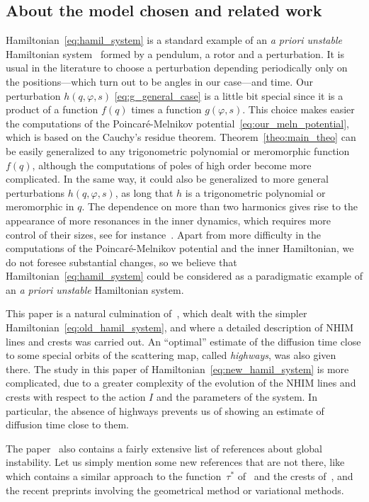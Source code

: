 \documentclass[a4paper,10pt]{article}
\theoremstyle{definition}
\begin{document}
\subsection{About the model chosen and related work}
Hamiltonian~\eqref{eq:hamil_system} is a standard example of an \emph{a priori unstable} Hamiltonian
system~\cite{ChierchiaGallavotti} formed by a pendulum, a rotor and a perturbation. It is usual
in the literature to choose a perturbation depending periodically only on the
positions---which turn out to be angles in our case---and time. Our perturbation $h(q,\varphi,s)$ \eqref{eq:g_general_case}
is a little bit special since it is a product of a function $f(q)$ times a function $g(\varphi,s)$. This
choice makes easier the computations of the Poincar\'e-Melnikov potential~\eqref{eq:our_meln_potential},
which is based on the Cauchy's residue theorem.
Theorem~\ref{theo:main_theo} can be easily generalized to any trigonometric polynomial or meromorphic function $f(q)$,
although the computations of poles of high order become more complicated. In the same way, it could also be
generalized to more general perturbations $h(q,\varphi,s)$, as long that $h$ is a trigonometric polynomial or meromorphic in $q$.
The dependence on more than two harmonics gives rise to the appearance of more resonances in the inner dynamics,
which requires more control of their sizes, see for instance~\cite{DelshamsS97,Delshams2009}.
Apart from more difficulty in the computations of the Poincar\'e-Melnikov
potential and the inner Hamiltonian, we do not foresee substantial changes, so we believe that
Hamiltonian~\eqref{eq:hamil_system} could be considered as a paradigmatic example
of an \emph{a priori unstable} Hamiltonian system.

This paper is a natural culmination of~\cite{Delshams2017}, which dealt
with the simpler Hamiltonian~\eqref{eq:old_hamil_system}, and where a detailed description of NHIM lines
and crests was carried out. An ``optimal'' estimate of the diffusion time close to some special orbits of the scattering map,
called \emph{highways}, was also given there. The study in this paper of Hamiltonian~\eqref{eq:new_hamil_system} is more
complicated, due to a greater complexity of the evolution of the NHIM lines and crests with respect to the action $I$
and the parameters of the system. In particular, the absence of highways prevents us of showing an estimate
of diffusion time close to them.

The paper~\cite{Delshams2017} also contains a fairly extensive list of references about global instability. Let us
simply mention some new references that are not there, like~\cite{Davletshin2016} which contains a similar approach
to the function~$\tau^*$ of~\cite{Seara2006} and the crests of~\cite{Delshams2011}, and the recent preprints
\cite{GelfreichT14,LazzariniMS15,Marco16,GideaM17,Cheng17}
involving the geometrical method or variational methods.
\end{document}
